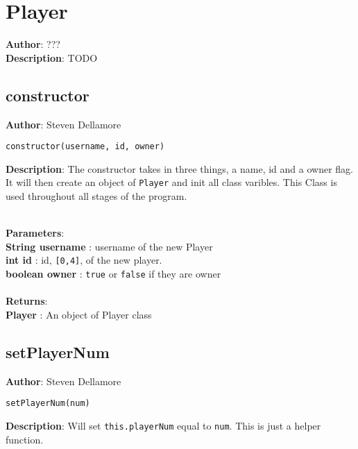 \documentclass[12pt]{article}
\begin{document}
\section{Player}
\textbf{Author}: ??? \\
\textbf{Description}: TODO \\



\subsection{constructor}
\textbf{Author}: Steven Dellamore 
\vspace*{1\baselineskip}
\begin{lstlisting}
constructor(username, id, owner)
\end{lstlisting} 
\vspace*{1\baselineskip}
\textbf{Description}: The constructor takes in three things, a name, id and a owner flag. It will then create an object of \texttt{Player} and init all class varibles. This Class is used throughout all stages of the program. 


\textbf{\large{\\Parameters}}:\\
\textbf{String username }: username of the new Player\\
\textbf{int id }: id, \texttt{[0,4]}, of the new player.\\
\textbf{boolean owner }: \texttt{true} or \texttt{false} if they are owner\\\textbf{\large{\\Returns}}:\\
\textbf{Player }: An object of Player class\\

\subsection{setPlayerNum}
\textbf{Author}: Steven Dellamore 
\vspace*{1\baselineskip}
\begin{lstlisting}
setPlayerNum(num)
\end{lstlisting} 
\vspace*{1\baselineskip}
\textbf{Description}: Will set \texttt{this.playerNum} equal to \texttt{num}. This is just a helper function. 
\end{document}

